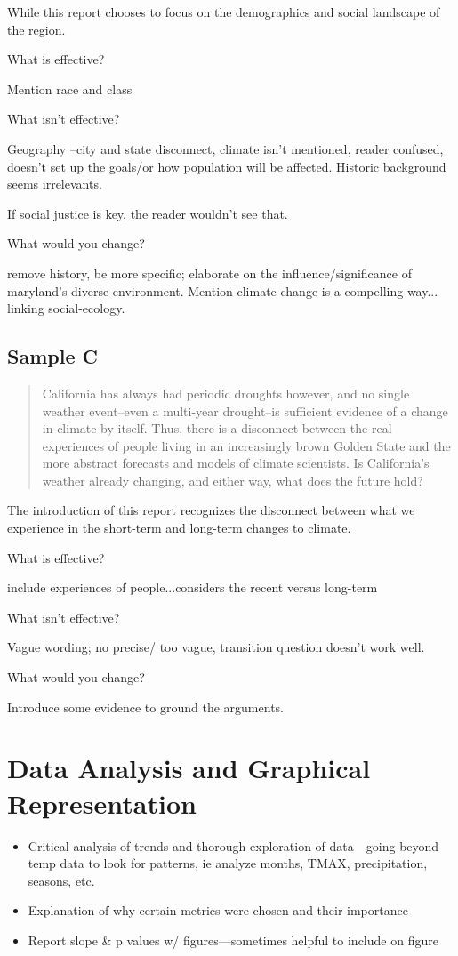 \documentclass{article}\usepackage[]{graphicx}\usepackage[]{color}
\begin{document}
While this report chooses to focus on the demographics and social landscape of the region. 

What is effective?

Mention race and class

What isn't effective?

Geography --city and state disconnect, climate isn't mentioned, reader confused, doesn't set up the goals/or how population will be affected.
Historic background seems irrelevants.

If social justice is key, the reader wouldn't see that.

What would you change?

remove history, be more specific; elaborate on the influence/significance of maryland's diverse environment. Mention climate change is a compelling way... linking social-ecology. 

\subsection{Sample C}

\begin{quote}
California has always had periodic droughts however, and no single weather event--even a multi-year drought--is sufficient evidence of a change in climate by itself. Thus, there is a disconnect between the real experiences of people living in an increasingly brown Golden State and the more abstract forecasts and models of climate scientists. Is California’s weather already changing, and either way, what does the future hold?
\end{quote}
The introduction of this report recognizes the disconnect between what we experience in the short-term and long-term changes to climate. 


What is effective?

include experiences of people...considers the recent versus long-term

What isn't effective?

Vague wording; no precise/ too vague, transition question doesn't work well.


What would you change?

Introduce some evidence to ground the arguments.

\section{Data Analysis and Graphical Representation}
\begin{itemize}
  \item Critical analysis of trends and thorough exploration of data—going beyond temp data to look for patterns, ie analyze months, TMAX, precipitation, seasons, etc.
  \item Explanation of why certain metrics were chosen and their importance
  \item Report slope \& p values w/ figures—sometimes helpful to include on figure
\end{itemize}
\end{document}
